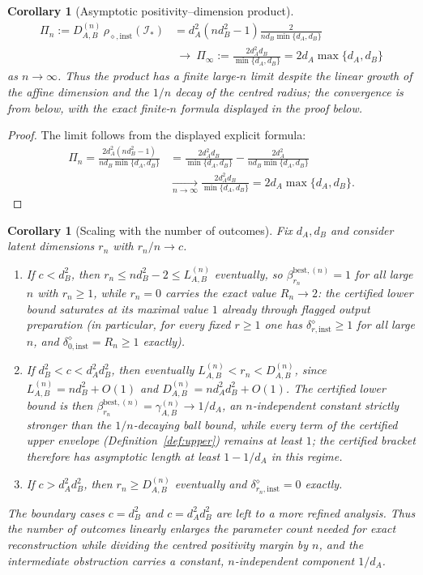 \documentclass[11pt,a4paper]{article}
\newtheorem{corollary}[theorem]{Corollary}
\begin{document}
\begin{corollary}[Asymptotic positivity--dimension product]
\label{cor:asymptotic}
\begin{align*}
\Pi_n:=D_{A,B}^{(n)}\,\rho_{\diamond,\mathrm{inst}}(\mathcal I_*)
&=d_A^2(nd_B^2-1)\frac{2}{nd_B\min\{d_A,d_B\}}\\
&\ \longrightarrow\ 
\Pi_\infty:=\frac{2d_A^2d_B}{\min\{d_A,d_B\}}
=2d_A\max\{d_A,d_B\}
\end{align*}
as $n\to\infty$. Thus the product has a finite large-$n$ limit despite the linear growth of the affine dimension and the $1/n$ decay of the centred radius; the convergence is from below, with the exact finite-$n$ formula displayed in the proof below.
\end{corollary}

\begin{proof}
The limit follows from the displayed explicit formula:
\begin{align*}
\Pi_n=\frac{2d_A^2(nd_B^2-1)}{nd_B\min\{d_A,d_B\}}
&=\frac{2d_A^2d_B}{\min\{d_A,d_B\}}-\frac{2d_A^2}{nd_B\min\{d_A,d_B\}}\\
&\xrightarrow[n\to\infty]{}\frac{2d_A^2d_B}{\min\{d_A,d_B\}}
=2d_A\max\{d_A,d_B\}.
\end{align*}
\end{proof}

\begin{corollary}[Scaling with the number of outcomes]
\label{cor:scaling}
Fix $d_A,d_B$ and consider latent dimensions $r_n$ with $r_n/n\to c$.
\begin{enumerate}[leftmargin=*,itemsep=2pt]
\item If $c<d_B^2$, then $r_n\le nd_B^2-2\le L_{A,B}^{(n)}$ eventually, so $\beta_{r_n}^{\mathrm{best},(n)}=1$ for all large $n$ with $r_n\ge1$, while $r_n=0$ carries the exact value $R_n\to2$: the certified lower bound saturates at its maximal value $1$ already through flagged output preparation (in particular, for every fixed $r\ge1$ one has $\delta_{r,\mathrm{inst}}^{\diamond}\ge1$ for all large $n$, and $\delta_{0,\mathrm{inst}}^{\diamond}=R_n\ge1$ exactly).
\item If $d_B^2<c<d_A^2d_B^2$, then eventually $L_{A,B}^{(n)}<r_n<D_{A,B}^{(n)}$, since $L_{A,B}^{(n)}=nd_B^2+O(1)$ and $D_{A,B}^{(n)}=nd_A^2d_B^2+O(1)$. The certified lower bound is then $\beta_{r_n}^{\mathrm{best},(n)}=\gamma_{A,B}^{(n)}\to1/d_A$, an $n$-independent constant strictly stronger than the $1/n$-decaying ball bound, while every term of the certified upper envelope (Definition~\ref{def:upper}) remains at least $1$; the certified bracket therefore has asymptotic length at least $1-1/d_A$ in this regime.
\item If $c>d_A^2d_B^2$, then $r_n\ge D_{A,B}^{(n)}$ eventually and $\delta_{r_n,\mathrm{inst}}^{\diamond}=0$ exactly.
\end{enumerate}
The boundary cases $c=d_B^2$ and $c=d_A^2d_B^2$ are left to a more refined analysis. Thus the number of outcomes linearly enlarges the parameter count needed for exact reconstruction while dividing the centred positivity margin by $n$, and the intermediate obstruction carries a constant, $n$-independent component $1/d_A$.
\end{corollary}
\end{document}
